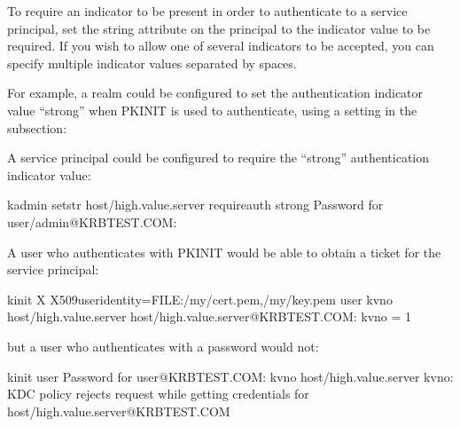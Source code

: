 \documentclass[letterpaper,10pt,english]{sphinxmanual}
\begin{document}
To require an indicator to be present in order to authenticate to a
service principal, set the  string attribute on the
principal to the indicator value to be required.  If you wish to allow
one of several indicators to be accepted, you can specify multiple
indicator values separated by spaces.

For example, a realm could be configured to set the authentication
indicator value “strong” when PKINIT is used to authenticate, using a
setting in the {\hyperref[\detokenize{admin/conf_files/kdc_conf:kdc-realms}]{}} subsection:

%
\begin{sphinxVerbatim}[commandchars=\\\{\}]
  
\end{sphinxVerbatim}

A service principal could be configured to require the “strong”
authentication indicator value:

%
\begin{sphinxVerbatim}[commandchars=\\\{\}]
\PYGZdl{} kadmin setstr host/high.value.server require\PYGZus{}auth strong
Password for user/admin@KRBTEST.COM:
\end{sphinxVerbatim}

A user who authenticates with PKINIT would be able to obtain a ticket
for the service principal:

%
\begin{sphinxVerbatim}[commandchars=\\\{\}]
\PYGZdl{} kinit \PYGZhy{}X X509\PYGZus{}user\PYGZus{}identity=FILE:/my/cert.pem,/my/key.pem user
\PYGZdl{} kvno host/high.value.server
host/high.value.server@KRBTEST.COM: kvno = 1
\end{sphinxVerbatim}

but a user who authenticates with a password would not:

%
\begin{sphinxVerbatim}[commandchars=\\\{\}]
\PYGZdl{} kinit user
Password for user@KRBTEST.COM:
\PYGZdl{} kvno host/high.value.server
kvno: KDC policy rejects request while getting credentials for
  host/high.value.server@KRBTEST.COM
\end{sphinxVerbatim}
\end{document}
